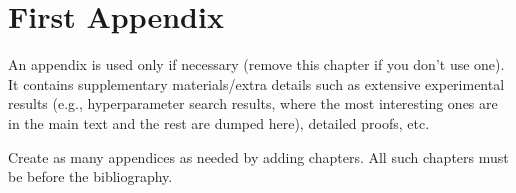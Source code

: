 \documentclass{report}
\begin{document}
\appendix

\chapter{First Appendix}

An appendix is used only if necessary (remove this chapter if you don't use one). It contains supplementary materials/extra details such as extensive experimental results (e.g., hyperparameter search results, where the most interesting ones are in the main text and the rest are dumped here), detailed proofs, etc. 

Create as many appendices as needed by adding chapters. All such chapters must be before the bibliography. 
\fi



\end{document}
